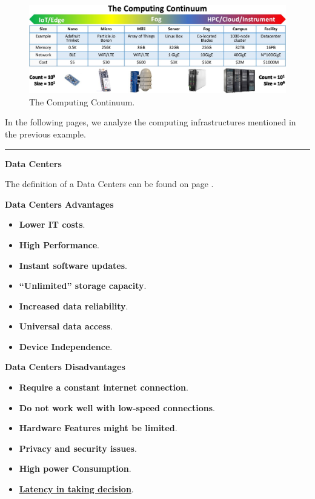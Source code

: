 \documentclass[a4paper]{article}
\newcommand{\dquotes}[1]{``#1''}
\newcommand{\longline}{\noindent\rule{\textwidth}{0.4pt}}
\begin{document}
    \newpage

    \begin{figure}[!htp]
        \centering
        \includegraphics[width=\textwidth]{img/computing-continuum-1.png}
        \caption{The Computing Continuum.\cite{computing-infrastructures-slides}}
    \end{figure}

    \noindent
    In the following pages, we analyze the computing infrastructures mentioned in the previous example.

    \longline

    \begin{center}
        \large
        \textcolor{Red3}{\textbf{Data Centers}}
    \end{center}
    
    \noindent
    The definition of a Data Centers can be found on page \pageref{Data Center definition}.

    \begin{flushleft}
        \textcolor{Green3}{ \textbf{Data Centers Advantages}}
    \end{flushleft}
    \begin{itemize}
        \item \textbf{Lower IT costs}.
        \item \textbf{High Performance}.
        \item \textbf{Instant software updates}.
        \item \textbf{\dquotes{Unlimited} storage capacity}.
        \item \textbf{Increased data reliability}.
        \item \textbf{Universal data access}.
        \item \textbf{Device Independence}.
    \end{itemize}

    \begin{flushleft}
        \textcolor{Red2}{ \textbf{Data Centers Disadvantages}}
    \end{flushleft}
    \begin{itemize}
        \item \textbf{Require a constant internet connection}.
        \item \textbf{Do not work well with low-speed connections}.
        \item \textbf{Hardware Features might be limited}.
        \item \textbf{Privacy and security issues}.
        \item \textbf{High power Consumption}.
        \item \textbf{\underline{Latency in taking decision}}.
    \end{itemize}
\end{document}
